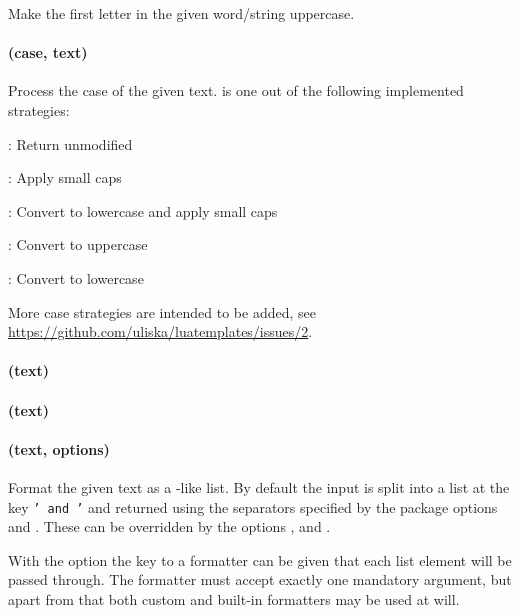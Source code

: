 \documentclass{scrartcl}
\begin{document}
Make the first letter in the given word/string uppercase.


\paragraph{ (case, text)}

Process the case of the given text.   is one out of the following
implemented strategies:

\begin{itemize*}
\item {}: Return unmodified
\item {}: Apply small caps
\item {}: Convert to lowercase and apply small caps
\item {}: Convert to uppercase
\item {}: Convert to lowercase
\end{itemize*}

More case strategies are intended to be added, see
\url{https://github.com/uliska/luatemplates/issues/2}.

\paragraph{ (text)}

\paragraph{ (text)}

\paragraph{ (text, options)}

Format the given text as a -like list.  By default the input
is split into a list at the key \texttt{' and '} and returned using the
separators specified by the package options  and
.  These can be overridden by the options
,  and .

With the option  the key to a formatter can be given that each
list element will be passed through.  The formatter must accept exactly one
mandatory argument, but apart from that both custom and built-in formatters may
be used at will.
\end{document}
